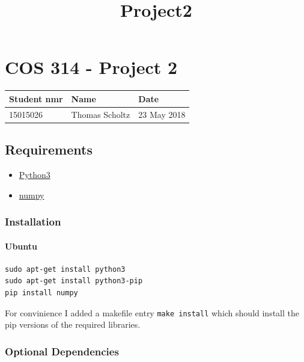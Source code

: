 \documentclass[11pt]{article}
\title{Project2}
\providecommand{\tightlist}{%
      \setlength{\itemsep}{0pt}\setlength{\parskip}{0pt}}
\begin{document}
    
    
    \maketitle
    
    

    
    \hypertarget{cos-314---project-2}{%
\section{COS 314 - Project 2}\label{cos-314---project-2}}

\begin{longtable}[]{@{}lll@{}}
\toprule
Student nmr & Name & Date\tabularnewline
\midrule
\endhead
15015026 & Thomas Scholtz & 23 May 2018\tabularnewline
\bottomrule
\end{longtable}

\hypertarget{requirements}{%
\subsection{Requirements}\label{requirements}}

\begin{itemize}
\tightlist
\item
  \href{https://docs.python.org/3/}{Python3}
\item
  \href{http://www.numpy.org/}{numpy}
\end{itemize}

\hypertarget{installation}{%
\subsubsection{Installation}\label{installation}}

\hypertarget{ubuntu}{%
\paragraph{Ubuntu}\label{ubuntu}}

\begin{verbatim}
sudo apt-get install python3
sudo apt-get install python3-pip  
pip install numpy
\end{verbatim}

For convinience I added a makefile entry \texttt{make\ install} which
should install the pip versions of the required libraries.

\hypertarget{optional-dependencies}{%
\subsubsection{Optional Dependencies}\label{optional-dependencies}}
\end{document}
